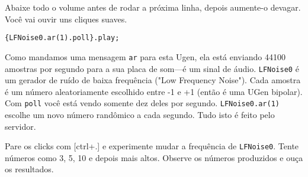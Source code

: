 Abaixe todo o volume antes de rodar a próxima linha, depois aumente-o devagar. Você vai ouvir uns cliques suaves.

\begin{lstlisting}[style=SuperCollider-IDE, basicstyle=\scttfamily\footnotesize]
{LFNoise0.ar(1).poll}.play;
\end{lstlisting}

Como mandamos uma mensagem \texttt{ar} para esta Ugen, ela está enviando 44100 amostras por segundo para a sua placa de som---é um sinal de áudio. \texttt{LFNoise0} é um gerador de ruído de baixa frequência ("Low Frequency Noise"). Cada amostra é um número aleatoriamente escolhido entre -1 e +1 (então é uma UGen bipolar). Com \texttt{poll} você está vendo somente dez deles por segundo. \texttt{LFNoise0.ar(1)} escolhe um novo número randômico a cada segundo. Tudo isto é feito pelo servidor.

Pare os clicks com [ctrl+.] e experimente mudar a frequência de \texttt{LFNoise0}. Tente números como 3, 5, 10 e depois mais altos. Observe os números produzidos e ouça os resultados.

